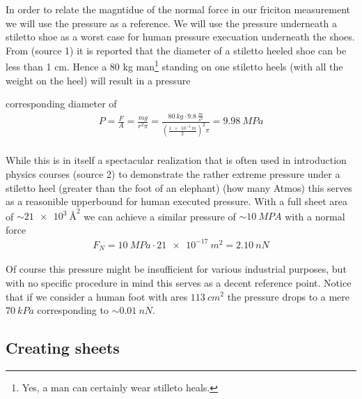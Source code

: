 
In order to relate the magntidue of the normal force in our friciton measurement
we will use the pressure as a reference. We will use the pressure underneath a
stiletto shoe as a worst case for human pressure execuation underneath the
shoes. From (source 1) it is reported that the diameter of a stiletto heeled
shoe can be less than 1 cm. Hence a 80 kg man\footnote{Yes, a man can certainly
wear stilleto heals.} standing on one stiletto heels (with all the weight on the
heel) will result in a pressure

corresponding diameter of 
\begin{align*}
  P = \frac{F}{A} = \frac{mg}{r^2\pi} = \frac{\SI{80}{kg} \cdot \SI{9.8}{\frac{m}{s^2}}}{(\frac{\SI{1e-2}{m}}{2})^2 \pi} = \SI{9.98}{MPa} \\
\end{align*} 

While this is in itself a spectacular realization that is often used in
introduction physics courses (source 2) to demonstrate the rather extreme
pressure under a stiletto heel (greater than the foot of an elephant) (how many
Atmos) this serves as a reasonible upperbound for human executed pressure. With
a full sheet area of $\sim\SI{21e3}{Å^2}$ we can achieve a similar pressure of
$\sim \SI{10}{MPA}$ with a normal force 
\begin{align*}
  F_N = \SI{10}{MPa} \cdot \SI{21e-17}{m^2} = \SI{2.10}{nN}  
\end{align*}

Of course this pressure might be insufficient for various industrial purposes,
but with no specific procedure in mind this serves as a decent reference point.
Notice that if we consider a human foot with ares $\SI{113}{cm^2}$ the pressure
drops to a mere $\SI{70}{kPa}$ corresponding to $\sim \SI{0.01}{nN}$.



\subsection{Creating sheets}

